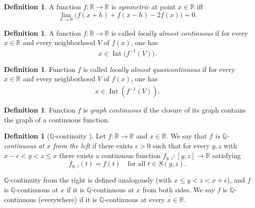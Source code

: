 \documentclass[11pt]{amsart} %
\theoremstyle{definition}
\newtheorem{definition}[theorem]{Definition}
\begin{document}
\begin{definition} 
A function \(f:\mathbb R\to\mathbb R\) is \emph{symmetric} at point \(x\in\mathbb R\) \cite{19} iff
\begin{equation} 
\lim_{h\to 0}\bigl(f(x+h)+f(x-h)-2f(x)\bigr)=0.
\end{equation} 
\end{definition} 

\begin{definition} 
A function \(f:\mathbb R\to\mathbb R\) is called \emph{locally almost continuous} \cite{21} if for every \(x\in\mathbb R\) and every neighborhood \(V\) of \(f(x)\), one has
\begin{equation} 
x\in \operatorname{Int}(\overline{f^{-1}(V))}.
\end{equation} 
\end{definition} 

\begin{definition} 
Function $f$ is called \emph{locally almost quasicontinuous} \cite{21} if for every \(x\in\mathbb R\) and every neighborhood \(V\) of \(f(x)\), one has
\begin{equation}
x\in \overline{\operatorname{Int}(\overline{f^{-1}(V)})}.
\end{equation} 
\end{definition}


\begin{definition} 
Function $f$ is \emph{graph continuous} \cite{20} if the closure of its graph contains the graph of a continuous function.
\end{definition} 

\begin{definition}[$\mathbb{Q}$-continuity \cite{10}]
Let $f:\mathbb{R}\rightarrow\mathbb{R}$ and $x\in\mathbb{R}.$ We say that \emph{$f$ is
$\mathbb{Q}$-continuous at $x$ from the left} if there exists $\epsilon>0$ such that for every $y, z$ with
$x-\epsilon<y<z\le x$ there exists a continuous function $f_{y,z}:[y,z]\rightarrow\mathbb{R}$ satisfying
\begin{equation}
f_{y,z}(t)=f(t) \quad \text{for all } t\in S(y,z).
\end{equation}
\label{def:qcont}
\end{definition}

$\mathbb{Q}$-continuity from the right is defined analogously (with $x\le y<z<x+\epsilon$), and
$f$ is $\mathbb{Q}$-continuous at $x$ if it is $\mathbb{Q}$-continuous at $x$ from both sides. We say $f$ is
$\mathbb{Q}$-continuous (everywhere) if it is $\mathbb{Q}$-continuous at every $x\in\mathbb{R}.$
\end{document}

